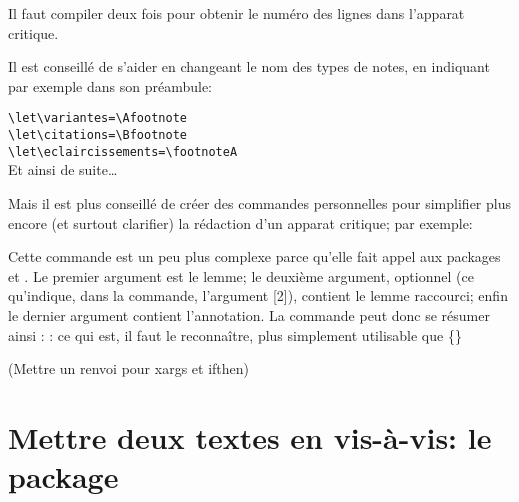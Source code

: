 \begin{attention}
Il faut compiler deux fois pour obtenir le numéro des lignes dans l'apparat critique.
\end{attention}



Il est conseillé de s'aider en changeant le nom des types de notes, en indiquant par exemple dans son préambule: 

\noindent \verb|\let\variantes=\Afootnote| \\
\verb|\let\citations=\Bfootnote| \\
\verb|\let\eclaircissements=\footnoteA| \\
Et ainsi de suite\dots 

Mais il est plus conseillé de créer des commandes personnelles pour simplifier plus encore  (et surtout clarifier) la rédaction d'un apparat critique; par exemple:

\begin{latexcode}
\usepackage{ifthen, xargs}
\end{latexcode}

Cette commande est un peu plus complexe parce qu'elle fait appel aux packages  et . Le premier argument est le lemme; le deuxième argument, optionnel (ce qu'indique, dans la commande, l'argument [2]), contient le lemme raccourci; enfin le dernier argument contient l'annotation. La commande peut donc se résumer ainsi :  : ce qui est, il faut le reconnaître, plus simplement utilisable que \{\}


(Mettre un renvoi pour xargs et ifthen)

 






\section{Mettre deux textes en vis-à-vis: le package }


